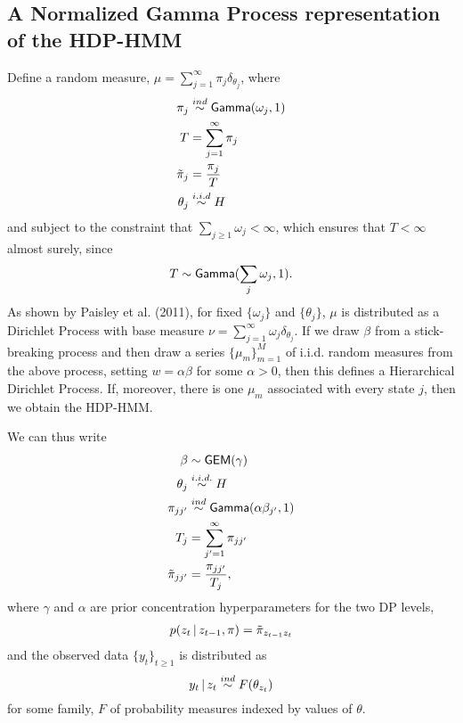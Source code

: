 \subsection{A Normalized Gamma Process representation of the HDP-HMM}
\label{sec:normalized-gamma}

Define a random measure, $\mu = \sum_{j=1}^{\infty} \pi_j \delta_{\theta_j}$, where 
\begin{align}
  \pi_j &\stackrel{ind}{\sim} \mathsf{Gamma}(\omega_j,1) \label{eq:17}\\
  T &= \sum_{j=1}^{\infty} \pi_j \label{eq:18}\\
  \tilde{\pi}_j &= \frac{\pi_j}{T}   \label{eq:16}\\
  \theta_j &\stackrel{i.i.d}{\sim} H \label{eq:19}
\end{align}
and subject to the constraint that $\sum_{j\geq 1} \omega_j < \infty$,
which ensures that $T < \infty$ almost surely, since
\begin{equation*}
  T \sim \mathsf{Gamma}(\sum_j \omega_j,1).
\end{equation*}
As shown by Paisley et al. (2011), 
for fixed $\{\omega_j\}$ and $\{\theta_j\}$, $\mu$ is distributed as a Dirichlet
Process with base measure $\nu = \sum_{j=1}^{\infty} \omega_j \delta_{\theta_j}$.
If we draw $\beta$ from a stick-breaking process and then draw a
series $\{\mu_m\}_{m=1}^M$ of
i.i.d. random measures from the above process, setting $w =
\alpha\beta$ for some $\alpha > 0$, then
this defines a Hierarchical Dirichlet Process.  If, moreover, there is
one $\mu_m$ associated with every state $j$, then we obtain the
HDP-HMM.

We can thus write
\begin{align}
  \beta &\sim \mathsf{GEM}(\gamma)   \label{eq:20} \\
  \theta_j &\stackrel{i.i.d.}{\sim} H \label{eq:21}\\
  \pi_{jj'} &\stackrel{ind}{\sim} \mathsf{Gamma}(\alpha \beta_{j'},1) \label{eq:22}\\
  T_j &= \sum_{j'=1}^{\infty} \pi_{jj'} \\
  \tilde{\pi}_{jj'} &= \frac{\pi_{jj'}}{T_j} \label{eq:23},
\end{align}
where $\gamma$ and $\alpha$ are prior concentration hyperparameters
for the two DP levels,
\begin{align}
  \label{eq:50}
  p(z_t \, \vert \, z_{t-1}, \pi) = \tilde{\pi}_{z_{t-1}z_t}
\end{align}
and the observed data
$\{y_t\}_{t\geq 1}$ is distributed as
\begin{equation}
  \label{eq:24}
  y_t \, \vert \, z_t \stackrel{ind}{\sim} F(\theta_{z_t})
\end{equation}
for some family, $F$ of probability measures indexed by values of $\theta$.

